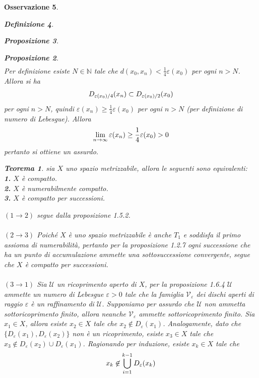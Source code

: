 \documentclass[oneside, 11pt]{amsbook}
\makeatletter
\newcommand{\0}{{(0)}}
\newcommand{\3}{{(3)}}
\theoremstyle{colonplain}
\newtheorem{thm}{Teorema}[chapter]
\newtheorem{prop}[thm]{Proposizione}
\theoremstyle{colondefinition}
\newtheorem{defn}[thm]{Definizione}
\theoremstyle{colonremark}
\newtheorem{rmk}[thm]{Osservazione}
\numberwithin{equation}{chapter}
\renewcommand{\proofname}{Dimostrazione}
\renewenvironment{proof}[1][\proofname]{\par
  \pushQED{\end{proof}}%
  \normalfont \topsep6\p@\@plus6\p@\relax
  \trivlist
  \item[\hskip\labelsep\bfseries #1:]\ignorespaces
}{%
  \popQED\endtrivlist\@endpefalse
}
\makeatother
\begin{document}
\begin{rmk}
\begin{defn}
\begin{prop}
\begin{prop}
\begin{proof}
\begin{align}
\end{align}
Per definizione esiste $N \in \mathbb{N}$ tale che $d(x_0, x_n) < \frac{1}{4}\varepsilon(x_0)$ per ogni $n > N$. Allora si ha 
\begin{align}
    D_{\varepsilon(x_0)/4}(x_n) \subset D_{\varepsilon(x_0)/2}(x_0) \notag
\end{align}
per ogni $n > N$, quindi $\varepsilon(x_n) \geq \frac{1}{4}\varepsilon(x_0)$ per ogni $n > N$ (per definizione di numero di Lebesgue). Allora 
\begin{align}
    \lim_{n \rightarrow \infty}\varepsilon(x_n) \geq \frac{1}{4}\varepsilon(x_0) > 0 \notag
\end{align}
pertanto si ottiene un assurdo.
\end{proof}
\begin{thm}
sia $X$ uno spazio metrizzabile, allora le seguenti sono equivalenti: \\
\textbf{1.} $X$ è compatto. \\
\textbf{2.} $X$ è numerabilmente compatto. \\
\textbf{3.} $X$ è compatto per successioni.
\begin{proof}
$(1 \rightarrow 2)$ segue dalla \textit{proposizione 1.5.2}. \\ \\
$(2 \rightarrow 3)$ Poiché $X$ è uno spazio metrizzabile è anche $T_1$ e soddisfa il primo assioma di numerabilità, pertanto per la \textit{proposizione 1.2.7} ogni successione che ha un punto di accumulazione ammette una sottosuccessione convergente, segue che $X$ è compatto per successioni. \\ \\
$(3 \rightarrow 1)$ Sia $\mathcal{U}$ un ricoprimento aperto di $X$, per la \textit{proposizione 1.6.4} $\mathcal{U}$ ammette un numero di Lebesgue $\varepsilon > 0$ tale che la famiglia $\mathcal{V}_\varepsilon$ dei dischi aperti di raggio $\varepsilon$ è un raffinamento di $\mathcal{U}$. Supponiamo per assurdo che $\mathcal{U}$ non ammetta sottoricoprimento finito, allora neanche $\mathcal{V}_\varepsilon$ ammette sottoricoprimento finito. Sia $x_1 \in X$, allora esiste $x_2 \in X$ tale che $x_2 \not\in D_\varepsilon(x_1)$. Analogamente, dato che $\{D_\varepsilon(x_1), D_\varepsilon(x_2)\}$ non è un ricoprimento, esiste $x_3 \in X$ tale che $x_3 \not\in D_\varepsilon(x_2) \cup D_\varepsilon(x_1)$. Ragionando per induzione, esiste $x_k \in X$ tale che
\begin{align}
    x_k \not\in \bigcup_{i = 1}^{k - 1}D_\varepsilon(x_k) \notag

\end{align}
\end{proof}
\end{thm}
\end{prop}
\end{prop}
\end{defn}
\end{rmk}
\end{document}

